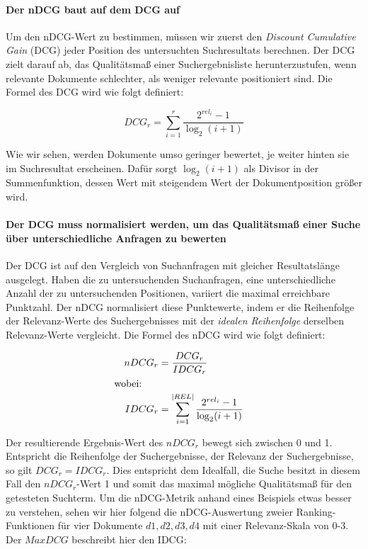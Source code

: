 \paragraph{Der nDCG baut auf dem DCG auf} Um den nDCG-Wert zu bestimmen, müssen wir zuerst den \textit{Discount Cumulative Gain} (DCG) jeder Position des untersuchten Suchresultats berechnen. Der DCG zielt darauf ab, das Qualitätsmaß einer Suchergebnisliste herunterzustufen, wenn relevante Dokumente schlechter, als weniger relevante positioniert sind. Die Formel des DCG wird wie folgt definiert:

\vspace{-1.5em}
\begin{equation}	
DCG_{r} = \sum\limits_{i=1}^r \frac{2^{rel_{i}} - 1}{\log_2(i+1)}
\end{equation}
\vspace{-1em}

Wie wir sehen, werden Dokumente umso geringer bewertet, je weiter hinten sie im Suchresultat erscheinen. Dafür sorgt $\log_2(i+1)$ als Divisor in der Summenfunktion, dessen Wert mit steigendem Wert der Dokumentposition größer wird.

\paragraph{Der DCG muss normalisiert werden, um das Qualitätsmaß einer Suche über unterschiedliche Anfragen zu bewerten}
Der DCG ist auf den Vergleich von Suchanfragen mit gleicher Resultatslänge ausgelegt. Haben die zu untersuchenden Suchanfragen, eine unterschiedliche Anzahl der zu untersuchenden Positionen, variiert die maximal erreichbare Punktzahl. Der nDCG normalisiert diese Punktewerte, indem er die Reihenfolge der Relevanz-Werte des Suchergebnisses mit der \textit{idealen Reihenfolge} derselben Relevanz-Werte vergleicht. Die Formel des nDCG wird wie folgt definiert:

\vspace{-.25em}
\begin{spacing}{.25}
\begin{align}
  &&	nDCG_{r} &= \frac{DCG_r}{IDCG_r} &\\
  \intertext{wobei:}
  &&	IDCG_{r} 	&= \sum\limits_{i=1}^{\vert REL \vert} \frac{2^{rel_{i}} - 1}{\log_2(i+1)}
\end{align}
\end{spacing}
\vspace{.5em}

Der resultierende Ergebnis-Wert des $nDCG_r$ bewegt sich zwischen 0 und 1. Entspricht die Reihenfolge der Suchergebnisse, der Relevanz der Suchergebnisse, so gilt $DCG_r = IDCG_r$. Dies entspricht dem Idealfall, die Suche besitzt in diesem Fall den $nDCG_r$-Wert 1 und somit das maximal mögliche Qualitätsmaß für den getesteten Suchterm. Um die nDCG-Metrik anhand eines Beispiels etwas besser zu verstehen, sehen wir hier folgend die nDCG-Auswertung zweier Ranking-Funktionen für vier Dokumente $d1, d2, d3, d4$ mit einer Relevanz-Skala von 0-3. Der $MaxDCG$ beschreibt hier den IDCG:

